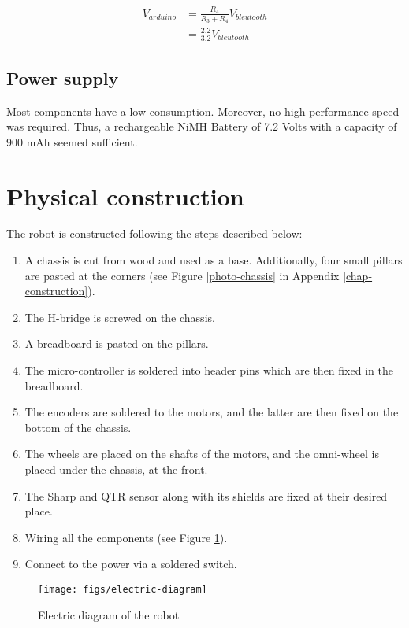\documentclass[12pt]{report}
\begin{document}
\begin{align*} 
V_{arduino} &=  \frac{R_4}{R_3+R_4}V_{bleutooth} \\[0.4cm]
 &=  \frac{2.2}{3.2}V_{bleutooth}
\end{align*}

\subsection*{Power supply}
Most components have a low consumption. Moreover, no high-performance speed was required. Thus, a rechargeable NiMH Battery of 7.2 Volts with a capacity of 900 mAh seemed sufficient.

\section{Physical construction}\label{sec:phys-constru}
The robot is constructed following the steps described below:
\begin{enumerate}
\item A chassis is cut from wood and used as a base. Additionally, four small pillars are pasted at the corners (see Figure \ref{photo-chassis} in Appendix \ref{chap-construction}).
\item The H-bridge is screwed on the chassis.
\item A breadboard is pasted on the pillars.
\item The micro-controller is soldered into header pins which are then fixed in the breadboard.
\item The encoders are soldered to the motors, and the latter are then fixed on the bottom of the chassis.
\item The wheels are placed on the shafts of the motors, and the omni-wheel is placed under the chassis, at the front.
\item The Sharp and QTR sensor along with its shields are fixed at their desired place.
\item Wiring all the components (see Figure \ref{fig:electric-diagram}).
\item Connect to the power via a soldered switch.
\end{enumerate}

\clearpage
\vfill
\begin{figure}[!h]
\centering
\texttt{[image: figs/electric-diagram]}
\caption{Electric diagram of the robot}
\label{fig:electric-diagram}
\end{figure}
\vfill
\clearpage
\end{document}
